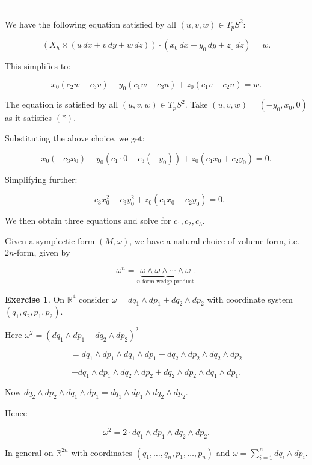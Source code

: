 \documentclass[11pt]{article}
\theoremstyle{definition}
\newtheorem{exercise}{Exercise}
\theoremstyle{remark}
\begin{document}
---

We have the following equation satisfied by all $(u, v, w) \in T_p S^2$:

\[
\left( X_h \times (u \, dx + v \, dy + w \, dz) \right) \cdot (x_0 \, dx + y_0 \, dy + z_0 \, dz) = w.
\]

This simplifies to:

\[
x_0 (c_2 w - c_3 v) - y_0 (c_1 w - c_3 u) + z_0 (c_1 v - c_2 u) = w.
\]

The equation is satisfied by all $(u, v, w) \in T_p S^2$. Take $(u, v, w) = (-y_0, x_0, 0)$ as it satisfies $(*)$.

Substituting the above choice, we get:

\[
x_0 \left( -c_3 x_0 \right) - y_0 \left( c_1 \cdot 0 - c_3 (-y_0) \right) + z_0 \left( c_1 x_0 + c_2 y_0 \right) = 0.
\]

Simplifying further:

\[
-c_3 x_0^2 - c_3 y_0^2 + z_0 (c_1 x_0 + c_2 y_0) = 0.
\]

We then obtain three equations and solve for $c_1, c_2, c_3$.

Given a symplectic form $(M, \omega)$, we have a natural choice of volume form, i.e.\ $2n$-form, given by

\[
\omega^n = \underbrace{\omega \wedge \omega \wedge \cdots \wedge \omega}_{n \text{ form wedge product}}.
\]

\begin{exercise}
On $\mathbb{R}^4$ consider $\omega = dq_1 \wedge dp_1 + dq_2 \wedge dp_2$ with coordinate system $(q_1, q_2, p_1, p_2)$.

Here $\omega^2 = (dq_1 \wedge dp_1 + dq_2 \wedge dp_2)^2$

\[
= dq_1 \wedge dp_1 \wedge dq_1 \wedge dp_1 + dq_2 \wedge dp_2 \wedge dq_2 \wedge dp_2
\]

\[
+ dq_1 \wedge dp_1 \wedge dq_2 \wedge dp_2 + dq_2 \wedge dp_2 \wedge dq_1 \wedge dp_1.
\]

Now $dq_2 \wedge dp_2 \wedge dq_1 \wedge dp_1 = dq_1 \wedge dp_1 \wedge dq_2 \wedge dp_2$.

Hence

\[
\omega^2 = 2 \cdot dq_1 \wedge dp_1 \wedge dq_2 \wedge dp_2.
\]
\end{exercise}

In general on $\mathbb{R}^{2n}$ with coordinates
$(q_1, \dots, q_n, p_1, \dots, p_n)$
and $\omega = \sum_{i=1}^n dq_i \wedge dp_i$.
\end{document}
